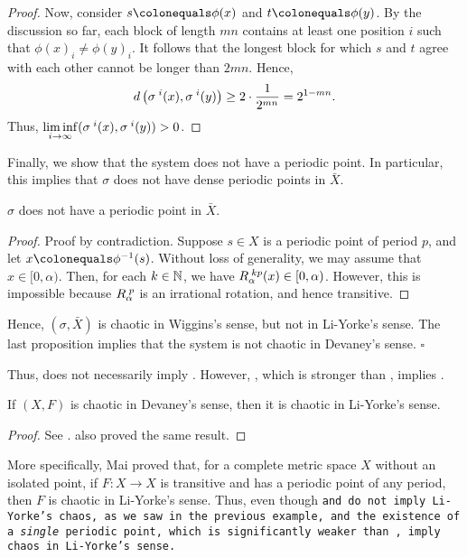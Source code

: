 \documentclass[10pt,twoside,draft]{book}
\begin{document}
\begin{example}
\begin{proposition}
\begin{proof}
  Now, consider $s \ceq \phi(x)$ and $t \ceq \phi(y)$.
  By the discussion so far, each block of length $mn$ contains at least one position $i$ such that $\phi(x)_{i} \neq \phi(y)_{i}$.
  It follows that the longest block for which $s$ and $t$ agree with each other cannot be longer than $2mn$.
  Hence,
  \begin{equation*}
    d\left( \sigma^{\;i}(x), \sigma^{\;i}(y) \right) 
    \geq 2 \cdot \frac{1}{2^{mn}}
    = 2^{1 - mn}.
  \end{equation*}
  Thus, $\liminf\limits_{i \to \infty} (\sigma^{\;i}(x), \sigma^{\;i}(y)) > 0$.
\end{proof}
  \end{proposition}
  Finally, we show that the system does not have a periodic point.
  In particular, this implies that $\sigma$ does not have dense periodic points in $\bar{X}$.
  \begin{proposition}
    $\sigma$ does not have a periodic point in $\bar{X}$.
    \begin{proof}
      Proof by contradiction.
      Suppose $s \in X$ is a periodic point of period $p$, and let $x \ceq \phi^{-1}(s)$. 
      Without loss of generality, we may assume that $x \in [0, \alpha)$. %
      Then, for each $k \in \mathbb{N}$, we have $R_\alpha^{\;kp}(x) \in [0, \alpha)$. %
      However, this is impossible because $R_\alpha^{\;p}$ is an irrational rotation, and hence transitive.
    \end{proof}
  \end{proposition}
  Hence, $(\sigma, \bar{X})$ is chaotic in Wiggins's sense, but not in Li-Yorke's sense.
  The last proposition implies that the system is not chaotic in Devaney's sense.
  $\square$
  \label{eg:blanchard}
\end{example}
Thus, \wig does not necessarily imply \liy.
However, \dev, which is stronger than \wig, implies \liy.
\begin{theorem}
  If $(X, F)$ is chaotic in Devaney's sense, then it is chaotic in Li-Yorke's sense.
  \begin{proof}
    See \citet{mai}.
    \citet{huang} also proved the same result.
  \end{proof}
  \label{thm:dev-liy}
\end{theorem}
More specifically, Mai proved that, for a complete metric space $X$ without an isolated point, if $F: X \to X$ is transitive and has a periodic point of any period, then $F$ is chaotic in Li-Yorke's sense.
Thus, even though \tt and \sdic do not imply Li-Yorke's chaos, as we saw in the previous example, \tt and the existence of a \textit{single} periodic point, which is significantly weaker than \dpp, imply chaos in Li-Yorke's sense.
\end{document}
